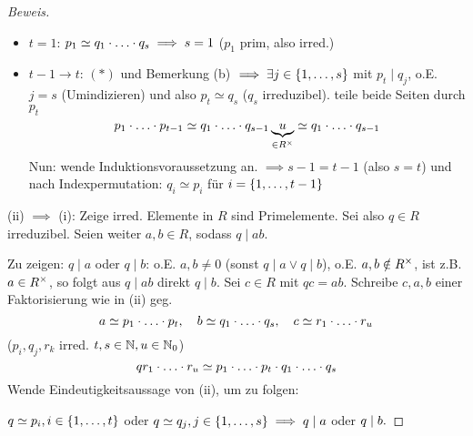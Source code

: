 \documentclass[a4paper]{report}
\begin{document}
\begin{satzdef}
\begin{proof}[Beweis]
  \begin{itemize}
    \item $t = 1$: $p_{1} \simeq q_{1}\cdot \ldots \cdot q_{s} \implies s = 1$ ($p_{1}$ prim, also irred.)
    \item $t-1 \to t$: $(*)$ und Bemerkung (b) $\implies \exists j \in \{1, \ldots, s\}$ mit $p_{t} \mid q_{j}$, o.E. $j = s$ (Umindizieren) und also $p_{t} \simeq q_{s}$ ($q_{s}$ irreduzibel). teile beide Seiten durch $p_{t}$
          \[p_{1} \cdot \ldots \cdot p_{t-1} \simeq q_{1} \cdot \ldots \cdot q_{s-1} \underbrace{u}_{\in R^\times} \simeq q_{1} \cdot \ldots \cdot q_{s-1}\]
          Nun: wende Induktionsvoraussetzung an. $\implies s-1 = t-1$ (also $s=t$) und nach Indexpermutation: $q_{i} \simeq p_{i}$ für $i = \{1, \ldots, t-1\}$
  \end{itemize}
  \item (ii) $\implies$ (i): Zeige irred. Elemente in $R$ sind Primelemente. Sei also $q \in R$ irreduzibel. Seien weiter $a, b \in R$, sodass $q \mid ab$.
  \item Zu zeigen: $q \mid a$ oder $q \mid b$: o.E. $a, b \ne 0$ (sonst $q \mid a \vee q \mid b$), o.E. $a, b \notin R^\times$, ist z.B. $a \in R^\times$, so folgt aus $q \mid ab$ direkt $q \mid b$. Sei $c \in R$ mit $qc = ab$. Schreibe $c , a, b$ einer Faktorisierung wie in (ii) geg.
  \[a \simeq p_{1} \cdot \ldots \cdot p_{t}, \quad b \simeq q_{1} \cdot \ldots \cdot q_{s},\quad c \simeq r_{1}\cdot \ldots \cdot r_{u}\]
  ($p_{i}, q_{j}, r_{k}$ irred. $t, s \in \mathbb{N}, u \in \mathbb{N}_0$)
  \[qr_{1}\cdot \ldots \cdot r_{u} \simeq p_{1}\cdot \ldots \cdot p_{t}\cdot q_{1}\cdot \ldots \cdot q_{s}\]
  Wende Eindeutigkeitsaussage von (ii), um zu folgen:
  \item $q \simeq p_{i}, i \in \{1, \ldots, t\}$ oder $q \simeq q_{j}, j \in \{1, \ldots, s\} \implies q \mid a$ oder $q \mid b.\qedhere$
\end{proof}
\end{satzdef}
\end{document}
